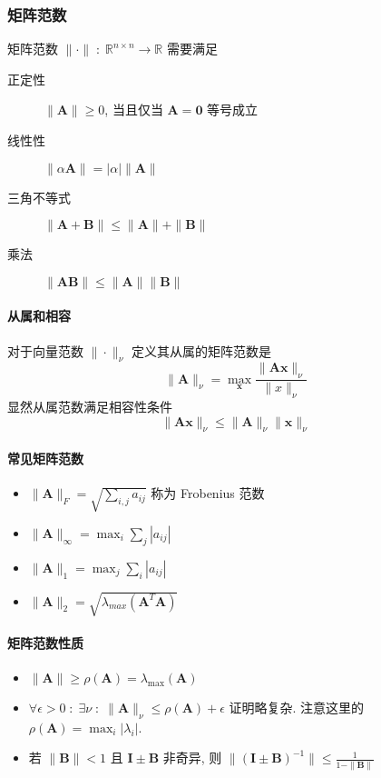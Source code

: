 \documentclass{ctexart}
\newcommand{\Rset}{\mathbb{R}}
\begin{document}
\subsubsection{矩阵范数}
    矩阵范数 $\|\cdot\|\;:\;\Rset^{n \times n}\to \Rset$ 需要满足
    \begin{description}
        \item[正定性] $\| \mathbf{A} \| \ge 0$, 当且仅当 $\mathbf{A} = \mathbf{0}$ 等号成立
        \item[线性性] $\|\alpha \mathbf{A}\| = |\alpha| \|\mathbf{A}\|$
        \item [三角不等式] $\|\mathbf{A} + \mathbf{B}\| \le \|\mathbf{A}\| + \|\mathbf{B}\|$
        \item[乘法] $\|\mathbf{A} \mathbf{B} \| \le \|\mathbf{A} \| \|\mathbf{B}\|$
    \end{description}
\paragraph{从属和相容}
    对于向量范数 $\|\cdot\|_{\nu}$ 定义其从属的矩阵范数是 \[
        \|\mathbf{A}\|_{\nu} = \max_{\mathbf{x}} \frac{\|\mathbf{A} \mathbf{x} \|_{\nu}}{\|x\|_{\nu}}
        \]
    显然从属范数满足相容性条件 \[
        \| \mathbf{A} \mathbf{x} \|_{\nu} \le \|\mathbf{A}\|_{\nu} \|\mathbf{x}\|_{\nu}\]
\paragraph{常见矩阵范数}
    \begin{itemize}
        \item $\|\mathbf{A}\|_F = \sqrt{\sum_{i,j} a_{ij}}$ 称为 Frobenius 范数
        \item $\|\mathbf{A}\|_{\infty} = \max_i \sum_j |a_{ij}|$
        \item $\|\mathbf{A}\|_1 = \max_j \sum_i |a_{ij}|$
        \item $\|\mathbf{A}\|_2 = \sqrt{\lambda_{max}(\mathbf{A}^T \mathbf{A})}$
    \end{itemize}
\paragraph{矩阵范数性质}
    \begin{itemize}
        \item $\|\mathbf{A} \| \ge \rho(\mathbf{A} ) = \lambda_{\max}(\mathbf{A} )$
        \item $\forall \epsilon > 0\;:\;\exists \nu\;:\;\|\mathbf{A}\|_{\nu} \le \rho(\mathbf{A}) + \epsilon$
            证明略复杂. 注意这里的 $\rho(\mathbf{A}) = \max_i |\lambda_i|$.
        \item 若 $\|\mathbf{B} \| < 1$ 且 $\mathbf{I} \pm \mathbf{B} $ 非奇异, 则
            $ \| (\mathbf{I} \pm \mathbf{B})^{-1} \| \le \frac{1}{1 - \|\mathbf{B}\|}$
    \end{itemize}
\end{document}
